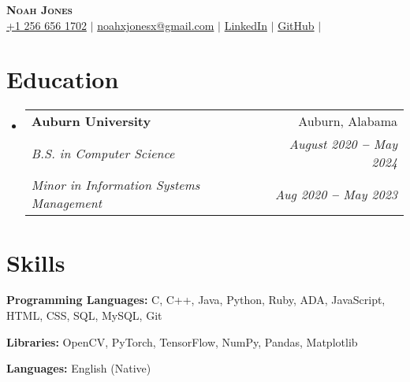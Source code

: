 \documentclass[letterpaper,11pt]{article}
\makeatletter
\newcommand{\resumeEducationHeading}[6]{
  \vspace{-2pt}\item
    \begin{tabular*}{0.97\textwidth}[t]{l@{\extracolsep{\fill}}r}
      \textbf{#1} & #2 \\
      \textit{\small#3} & \textit{\small #4} \\
      \textit{\small#5} & \textit{\small #6} \\
    \end{tabular*}\vspace{-5pt}
}
\newcommand{\resumeSubHeadingListStart}{\begin{itemize}[leftmargin=0.15in, label={}]}
\newcommand{\resumeSubHeadingListEnd}{\end{itemize}}
\makeatother
\begin{document}

\begin{center}
    \textbf{\Huge \scshape Noah Jones} \\ \vspace{3pt}
    \small
    \faMobile \hspace{.5pt} \href{tel:2566561702}{+1 256 656 1702}
    $|$
    \faAt \hspace{.5pt} \href{mailto:noahxjonesx@gmail.com}{noahxjonesx@gmail.com}
    $|$
    \faLinkedinSquare \hspace{.5pt} \href{https://www.linkedin.com/in/noah-jones-b15b62230/}{LinkedIn}
    $|$
    \faGithub \hspace{.5pt} \href{https://github.com/noahjonesx}{GitHub}
    $|$
\end{center}




\section{Education}
  \vspace{3pt}
  \resumeSubHeadingListStart
    
    \resumeEducationHeading
      {Auburn University
      }{Auburn, Alabama}
      {B.S. in Computer Science}{August 2020 \textbf{--} May 2024}
      {Minor in Information Systems Management}{Aug 2020 \textbf{--} May 2023}
    
  \resumeSubHeadingListEnd



\section{Skills}
  \vspace{2pt}
  \resumeSubHeadingListStart
    \small{\item{
        \textbf{Programming Languages:}{ C, C++, Java, Python, Ruby, ADA, JavaScript, HTML, CSS, SQL, MySQL, Git} \\ \vspace{3pt}
        
        \textbf{Libraries:}{ OpenCV, PyTorch, TensorFlow, NumPy, Pandas, Matplotlib} \\ \vspace{3pt}
        
        \textbf{Languages:}{ English (Native)}
        
    }}
  \resumeSubHeadingListEnd
\end{document}

